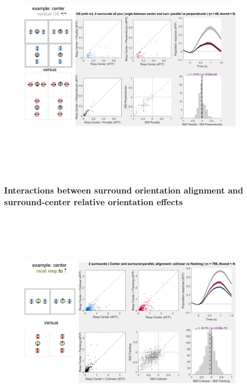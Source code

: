 \begin{figure}[H] \centering \includegraphics[width=11cm,height=11cm,keepaspectratio]{Figures/7.Results/population/sel/diagrams/10.png} 
\end{figure}

\subsubsection{Interactions between surround orientation alignment and surround-center relative orientation effects}

\begin{figure}[H] \centering \includegraphics[width=11cm,height=11cm,keepaspectratio]{Figures/7.Results/population/sel/diagrams/11.png} 
\end{figure}

